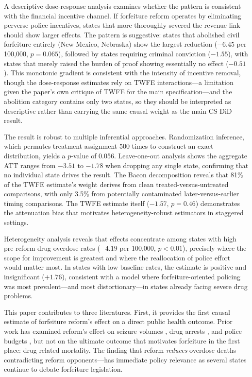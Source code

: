 \documentclass[12pt]{article}
\begin{document}
A descriptive dose-response analysis examines whether the pattern is consistent with the financial incentive channel. If forfeiture reform operates by eliminating perverse police incentives, states that more thoroughly severed the revenue link should show larger effects. The pattern is suggestive: states that abolished civil forfeiture entirely (New Mexico, Nebraska) show the largest reduction ($-6.45$ per 100,000, $p = 0.065$), followed by states requiring criminal conviction ($-1.55$), with states that merely raised the burden of proof showing essentially no effect ($-0.51$). This monotonic gradient is consistent with the intensity of incentive removal, though the dose-response estimates rely on TWFE interactions---a limitation given the paper's own critique of TWFE for the main specification---and the abolition category contains only two states, so they should be interpreted as descriptive rather than carrying the same causal weight as the main CS-DiD result.

The result is robust to multiple inferential approaches. Randomization inference, which permutes treatment assignment 500 times to construct an exact distribution, yields a $p$-value of 0.056. Leave-one-out analysis shows the aggregate ATT ranges from $-3.51$ to $-1.78$ when dropping any single state, confirming that no individual state drives the result. The \citet{goodman2021difference} Bacon decomposition reveals that 81\% of the TWFE estimate's weight derives from clean treated-versus-untreated comparisons, with only 3.5\% from potentially contaminated later-versus-earlier timing comparisons. The TWFE estimate itself ($-1.57$, $p = 0.46$) demonstrates the attenuation bias that motivates heterogeneity-robust estimators in staggered settings.

Heterogeneity analysis reveals that effects concentrate among states with high pre-reform drug overdose rates ($-4.19$ per 100,000, $p < 0.01$), precisely where the scope for improvement is greatest and where the reallocation of police effort would matter most. In states with low baseline rates, the estimate is positive and insignificant ($+1.76$), consistent with a model where forfeiture-oriented policing was most prevalent---and most distortionary---in states already facing severe drug problems.

This paper contributes to three literatures. First, it provides the first causal estimate of forfeiture reform's effect on a direct public health outcome. Prior work has examined reform's effect on seizure volumes \citep{carpenter2020effects}, drug arrests \citep{williams2019war}, and police budgets \citep{kelly2019asset}, but not on the ultimate outcome that motivates forfeiture in the first place: drug-related mortality. The finding that reform \emph{reduces} overdose deaths---contradicting reform opponents---has immediate policy relevance as several states continue to debate forfeiture legislation.
\end{document}
